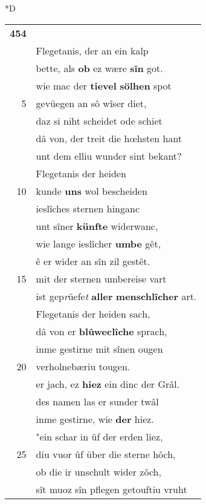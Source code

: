 \documentclass[8pt,a4paper,notitlepage]{article}
\begin{document}
\begin{table}[ht]
\begin{minipage}[t]{0.5\linewidth}
\small
\begin{center}*D
\end{center}
\begin{tabular}{rl}
\textbf{454} & \textbf{\textit{\begin{large}E\end{large}}r} was ein \textit{heiden} vaterhalp,\\ 
 & Flegetanis, der an ein kalp\\ 
 & bette, als \textbf{ob} ez wære \textbf{sîn} got.\\ 
 & wie mac der \textbf{tievel} \textbf{sölhen} spot\\ 
5 & gevüegen an sô wîser diet,\\ 
 & daz si niht scheidet ode schiet\\ 
 & dâ von, der treit die hœhsten hant\\ 
 & unt dem elliu wunder sint bekant?\\ 
 & Flegetanis der heiden\\ 
10 & kunde \textbf{uns} wol bescheiden\\ 
 & ieslîches sternen hinganc\\ 
 & unt sîner \textbf{künfte} widerwanc,\\ 
 & wie lange ieslîcher \textbf{umbe} gêt,\\ 
 & ê er wider an sîn zil gestêt.\\ 
15 & mit der sternen umbereise vart\\ 
 & ist gep\textit{r}üefe\textit{t} \textbf{aller} \textbf{menschlîcher} art.\\ 
 & Flegetanis der heiden sach,\\ 
 & dâ von er \textbf{blûweclîche} sprach,\\ 
 & inme gestirne mit sînen ougen\\ 
20 & verholnebæriu tougen.\\ 
 & er jach, ez \textbf{hiez} ein dinc der Grâl.\\ 
 & des namen las er sunder twâl\\ 
 & inme gestirne, wie \textbf{der} hiez.\\ 
 & "ein schar in ûf der erden liez,\\ 
25 & diu vuor ûf über die sterne hôch,\\ 
 & ob die ir unschult wider zôch,\\ 
 & sît muoz sîn pflegen getouftiu vruht\\ 

\end{tabular}
\end{minipage}
\end{table}
\end{document}

